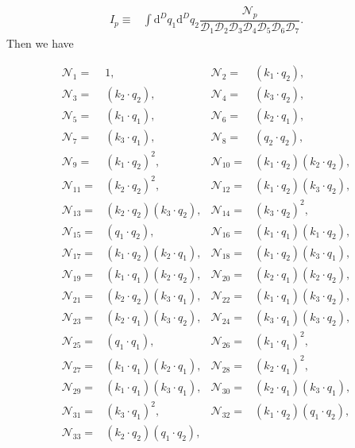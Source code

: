 \documentclass[twocolumn,aps,showpacs,nofootinbib,superscriptaddress,prd]{revtex4-2}
\begin{document}
\begin{align}
I_{p}\equiv&\int {\mathrm d}^{D}q_1{\mathrm d}^{D}q_2\dfrac{{\mathcal N}_p}{{\mathcal D}_1{\mathcal D}_2{\mathcal D}_3{\mathcal D}_4{\mathcal D}_5{\mathcal D}_6{\mathcal D}_7}.
\end{align}
Then we have
\begin{widetext}
\begin{align}
{\mathcal N}_{1}=&1,&
{\mathcal N}_{2}=&(k_1\cdot q_2),\nonumber\\
{\mathcal N}_{3}=&(k_2\cdot q_2),&
{\mathcal N}_{4}=&(k_3\cdot q_2),\nonumber\\
{\mathcal N}_{5}=&(k_1\cdot q_1),&
{\mathcal N}_{6}=&(k_2\cdot q_1),\nonumber\\
{\mathcal N}_{7}=&(k_3\cdot q_1),&
{\mathcal N}_{8}=&(q_2\cdot q_2),\nonumber\\
{\mathcal N}_{9}=&(k_1\cdot q_2)^2,&
{\mathcal N}_{10}=&(k_1\cdot q_2) (k_2\cdot q_2),\nonumber\\
{\mathcal N}_{11}=&(k_2\cdot q_2)^2,&
{\mathcal N}_{12}=&(k_1\cdot q_2) (k_3\cdot q_2),\nonumber\\
{\mathcal N}_{13}=&(k_2\cdot q_2) (k_3\cdot q_2),&
{\mathcal N}_{14}=&(k_3\cdot q_2)^2,\nonumber\\
{\mathcal N}_{15}=&(q_1\cdot q_2),&
{\mathcal N}_{16}=&(k_1\cdot q_1) (k_1\cdot q_2),\nonumber\\
{\mathcal N}_{17}=&(k_1\cdot q_2) (k_2\cdot q_1),&
{\mathcal N}_{18}=&(k_1\cdot q_2) (k_3\cdot q_1),\nonumber\\
{\mathcal N}_{19}=&(k_1\cdot q_1) (k_2\cdot q_2),&
{\mathcal N}_{20}=&(k_2\cdot q_1) (k_2\cdot q_2),\nonumber\\
{\mathcal N}_{21}=&(k_2\cdot q_2) (k_3\cdot q_1),&
{\mathcal N}_{22}=&(k_1\cdot q_1) (k_3\cdot q_2),\nonumber\\
{\mathcal N}_{23}=&(k_2\cdot q_1) (k_3\cdot q_2),&
{\mathcal N}_{24}=&(k_3\cdot q_1) (k_3\cdot q_2),\nonumber\\
{\mathcal N}_{25}=&(q_1\cdot q_1),&
{\mathcal N}_{26}=&(k_1\cdot q_1)^2,\nonumber\\
{\mathcal N}_{27}=&(k_1\cdot q_1) (k_2\cdot q_1),&
{\mathcal N}_{28}=&(k_2\cdot q_1)^2,\nonumber\\
{\mathcal N}_{29}=&(k_1\cdot q_1) (k_3\cdot q_1),&
{\mathcal N}_{30}=&(k_2\cdot q_1) (k_3\cdot q_1),\nonumber\\
{\mathcal N}_{31}=&(k_3\cdot q_1)^2,&
{\mathcal N}_{32}=&(k_1\cdot q_2) (q_1\cdot q_2),\nonumber\\
{\mathcal N}_{33}=&(k_2\cdot q_2) (q_1\cdot q_2),&

\end{align}
\end{widetext}
\end{document}

